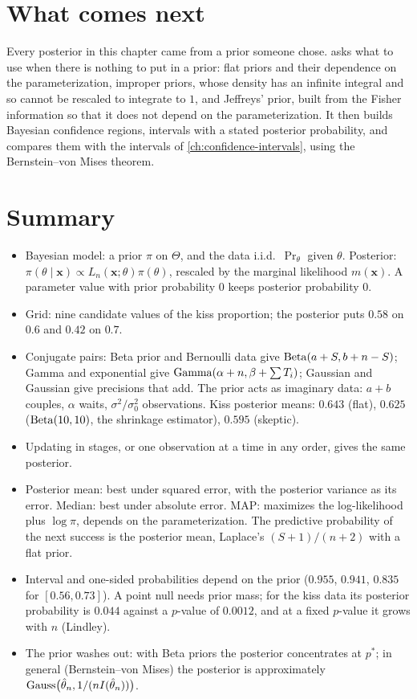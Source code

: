 \section{What comes next}
\label{sec:bayes-next}

Every posterior in this chapter came from a prior someone chose.
 asks what to use when there is nothing to put in a prior: flat priors and their dependence on the parameterization, improper priors, whose density has an infinite integral and so cannot be rescaled to integrate to $1$, and Jeffreys' prior, built from the Fisher information so that it does not depend on the parameterization.
It then builds Bayesian confidence regions, intervals with a stated posterior probability, and compares them with the intervals of \cref{ch:confidence-intervals}, using the Bernstein--von Mises theorem.

\section{Summary}
\label{sec:bayes-summary}

\begin{itemize}[nosep]
\item Bayesian model: a prior $\pi$ on $\Theta$, and the data i.i.d.\ $\Pr_\theta$ given $\theta$. Posterior: $\pi(\theta \mid \mathbf{x}) \propto L_n(\mathbf{x}; \theta)\pi(\theta)$, rescaled by the marginal likelihood $m(\mathbf{x})$. A parameter value with prior probability $0$ keeps posterior probability $0$.
\item Grid: nine candidate values of the kiss proportion; the posterior puts $0.58$ on $0.6$ and $0.42$ on $0.7$.
\item Conjugate pairs: Beta prior and Bernoulli data give $\mathrm{Beta}(a + S, b + n - S)$; Gamma and exponential give $\mathrm{Gamma}(\alpha + n, \beta + \sum T_i)$; Gaussian and Gaussian give precisions that add. The prior acts as imaginary data: $a + b$ couples, $\alpha$ waits, $\sigma^2/\sigma_0^2$ observations. Kiss posterior means: $0.643$ (flat), $0.625$ ($\mathrm{Beta}(10, 10)$, the shrinkage estimator), $0.595$ (skeptic).
\item Updating in stages, or one observation at a time in any order, gives the same posterior.
\item Posterior mean: best under squared error, with the posterior variance as its error. Median: best under absolute error. MAP: maximizes the log-likelihood plus $\log\pi$, depends on the parameterization. The predictive probability of the next success is the posterior mean, Laplace's $(S + 1)/(n + 2)$ with a flat prior.
\item Interval and one-sided probabilities depend on the prior ($0.955$, $0.941$, $0.835$ for $[0.56, 0.73]$). A point null needs prior mass; for the kiss data its posterior probability is $0.044$ against a $p$-value of $0.0012$, and at a fixed $p$-value it grows with $n$ (Lindley).
\item The prior washes out: with Beta priors the posterior concentrates at $p^*$; in general (Bernstein--von Mises) the posterior is approximately $\text{Gauss}\big(\hat{\theta}_n, 1/(nI(\hat{\theta}_n))\big)$.
\end{itemize}

